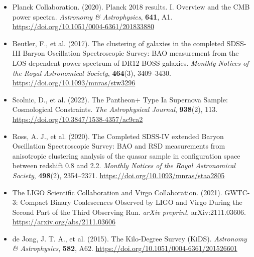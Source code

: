 \documentclass[12pt]{article}
\begin{document}
\begin{itemize}
	\item Planck Collaboration. (2020). Planck 2018 results. I. Overview and the CMB power spectra. \textit{Astronomy \& Astrophysics}, \textbf{641}, A1. \href{https://doi.org/10.1051/0004-6361/201833880}{https://doi.org/10.1051/0004-6361/201833880}
	
	\item Beutler, F., et al. (2017). The clustering of galaxies in the completed SDSS-III Baryon Oscillation Spectroscopic Survey: BAO measurement from the LOS-dependent power spectrum of DR12 BOSS galaxies. \textit{Monthly Notices of the Royal Astronomical Society}, \textbf{464}(3), 3409–3430. \href{https://doi.org/10.1093/mnras/stw3296}{https://doi.org/10.1093/mnras/stw3296}
	
	\item Scolnic, D., et al. (2022). The Pantheon+ Type Ia Supernova Sample: Cosmological Constraints. \textit{The Astrophysical Journal}, \textbf{938}(2), 113. \href{https://doi.org/10.3847/1538-4357/ac9ca2}{https://doi.org/10.3847/1538-4357/ac9ca2}
	
	\item Ross, A. J., et al. (2020). The Completed SDSS-IV extended Baryon Oscillation Spectroscopic Survey: BAO and RSD measurements from anisotropic clustering analysis of the quasar sample in configuration space between redshift 0.8 and 2.2. \textit{Monthly Notices of the Royal Astronomical Society}, \textbf{498}(2), 2354–2371. \href{https://doi.org/10.1093/mnras/staa2805}{https://doi.org/10.1093/mnras/staa2805}
	
	\item The LIGO Scientific Collaboration and Virgo Collaboration. (2021). GWTC-3: Compact Binary Coalescences Observed by LIGO and Virgo During the Second Part of the Third Observing Run. \textit{arXiv preprint}, arXiv:2111.03606. \href{https://arxiv.org/abs/2111.03606}{https://arxiv.org/abs/2111.03606}
	
	\item de Jong, J. T. A., et al. (2015). The Kilo-Degree Survey (KiDS). \textit{Astronomy \& Astrophysics}, \textbf{582}, A62. \href{https://doi.org/10.1051/0004-6361/201526601}{https://doi.org/10.1051/0004-6361/201526601}
\end{itemize}
\end{document}
